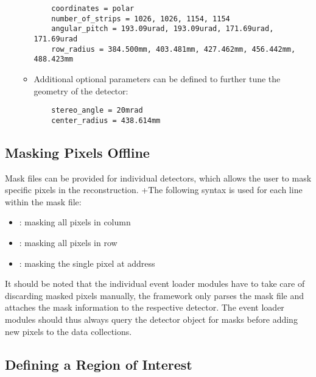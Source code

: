 \begin{itemize}
\begin{itemize}
  \begin{verbatim}
    coordinates = polar   
    number_of_strips = 1026, 1026, 1154, 1154
    angular_pitch = 193.09urad, 193.09urad, 171.69urad, 171.69urad
    row_radius = 384.500mm, 403.481mm, 427.462mm, 456.442mm, 488.423mm
  \end{verbatim}
  \item Additional optional parameters can be defined to further tune the geometry of the detector:
  \begin{verbatim}
    stereo_angle = 20mrad
    center_radius = 438.614mm    
  \end{verbatim}
  \end{itemize}   
\end{itemize}


\subsection{Masking Pixels Offline}
\label{sec:masking}

Mask files can be provided for individual detectors, which allows the user to mask specific pixels in the reconstruction.
+The following syntax is used for each line within the mask file:
\begin{itemize}
    \item {}: masking all pixels in column 
    \item {}: masking all pixels in row 
    \item {}: masking the single pixel at address 
\end{itemize}

\begin{warning}
It should be noted that the individual event loader modules have to take care of discarding masked pixels manually, the \corry framework only parses the mask file and attaches the mask information to the respective detector. The event loader modules should thus always query the detector object for masks before adding new pixels to the data collections.
\end{warning}

\subsection{Defining a Region of Interest}
\label{sec:roi}

